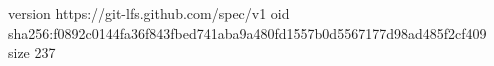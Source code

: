 version https://git-lfs.github.com/spec/v1
oid sha256:f0892c0144fa36f843fbed741aba9a480fd1557b0d5567177d98ad485f2cf409
size 237
